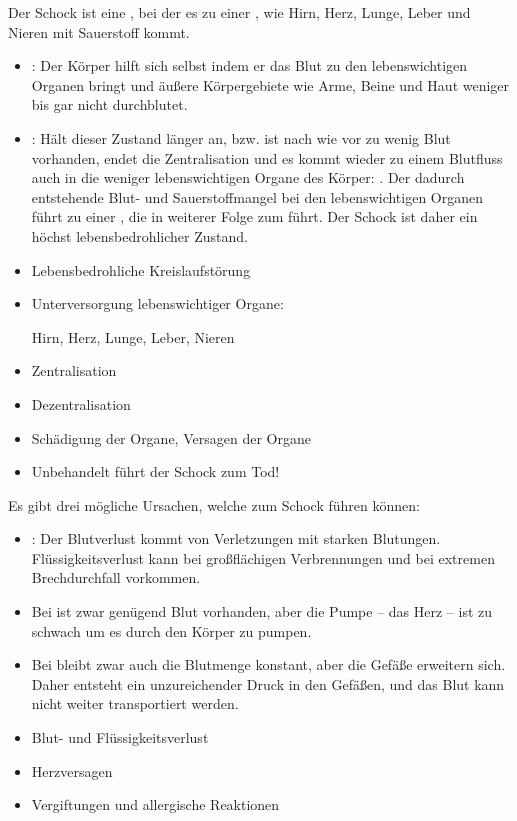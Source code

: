 {%
Der Schock ist eine ,
bei der es zu einer , wie Hirn, Herz, Lunge, Leber und Nieren mit
Sauerstoff kommt.

\begin{itemize}
  \item {}: Der Körper hilft sich selbst
  indem er das Blut zu den lebenswichtigen Organen bringt
  und äußere Körpergebiete wie Arme, Beine und Haut weniger
  bis gar nicht durchblutet.
  \item {}: Hält dieser Zustand länger an,
  bzw. ist nach wie vor zu wenig Blut vorhanden, 
  endet die Zentralisation 
  und es kommt wieder zu einem Blutfluss auch in die weniger lebenswichtigen Organe des Körper: 
  . 
  Der dadurch
  entstehende Blut- und Sauerstoffmangel bei den lebenswichtigen
  Organen führt zu einer , die in
  weiterer Folge zum  führt. 
  Der Schock ist daher ein höchst lebensbedrohlicher Zustand.
\end{itemize}

}{
\begin{itemize}
  \item Lebensbedrohliche Kreislaufstörung
  \item Unterversorgung lebenswichtiger Organe:
  
  Hirn, Herz,
  Lunge, Leber, Nieren
  \item Zentralisation
  \item Dezentralisation
  \item Schädigung der Organe, Versagen der Organe
  \item Unbehandelt führt der Schock zum Tod!
\end{itemize}
}{}{}{}



{
Es gibt drei mögliche Ursachen, welche zum Schock führen
können:

\begin{itemize}
  \item {}: Der Blutverlust
  kommt von Verletzungen mit starken Blutungen.
  Flüssigkeitsverlust kann bei großflächigen Verbrennungen
  und
  bei extremen Brechdurchfall vorkommen.
  \item Bei  ist zwar
  genügend Blut vorhanden, aber die Pumpe -- das Herz -- ist
  zu schwach um es durch den Körper zu pumpen.
  \item Bei 
  bleibt zwar auch die Blutmenge konstant, aber die Gefäße
  erweitern sich. Daher entsteht ein unzureichender Druck in
  den Gefäßen, und das Blut kann nicht weiter transportiert
  werden.
\end{itemize}
}{
\begin{itemize}
  \item Blut- und Flüssigkeitsverlust
  \item Herzversagen
  \item Vergiftungen und allergische Reaktionen
\end{itemize}
}{}{}{}


